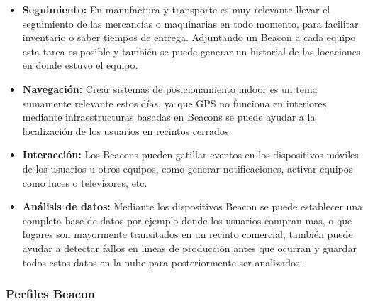 \begin{itemize}
\item \textbf{Seguimiento: } En manufactura y transporte es muy relevante llevar el seguimiento de las mercancías o maquinarias en todo momento, para facilitar inventario o saber tiempos de entrega. Adjuntando un Beacon a cada equipo esta tarea es posible y también se puede generar un historial de las locaciones en donde estuvo el equipo.

\item \textbf{Navegación: } Crear sistemas de posicionamiento indoor es un tema sumamente relevante estos días, ya que GPS no funciona en interiores, mediante infraestructuras basadas en Beacons se puede ayudar a la localización de los usuarios en recintos cerrados.

\item \textbf{Interacción: } Los Beacons pueden gatillar eventos en los dispositivos móviles de los usuarios u otros equipos, como generar notificaciones, activar equipos como luces o televisores, etc.

\item \textbf{Análisis de datos: } Mediante los dispositivos Beacon se puede establecer una completa base de datos por ejemplo donde los usuarios compran mas, o que lugares son mayormente transitados en un recinto comercial, también puede ayudar a detectar fallos en lineas de producción antes que ocurran y guardar todos estos datos en la nube para posteriormente ser analizados.


\end{itemize}

\subsubsection{Perfiles Beacon}

